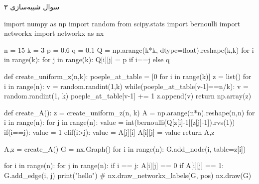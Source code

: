 سوال شبیه‌سازی ۳

\begin{latin}
\begin{python}
import numpy as np
import random
from scipy.stats import bernoulli
import networkx
import networkx as nx

n = 15
k = 3
p = 0.6
q = 0.1
Q = np.arange(k*k, dtype=float).reshape(k,k)
for i in range(k):
    for j in range(k):
        Q[i][j] = p if i==j else q

def create_uniform_z(n,k):
    poeple_at_table = [0 for i in range(k)]
    z = list()
    for i in range(n):
        v = random.randint(1,k)
        while(poeple_at_table[v-1]==n/k): v = random.randint(1, k)
        poeple_at_table[v-1] += 1
        z.append(v)
    return np.array(z)


def create_A():
    z = create_uniform_z(n, k)
    A = np.arange(n*n).reshape(n,n)
    for i in range(n):
        for j in range(n):
            value = int(bernoulli(Q[z[i]-1][z[j]-1]).rvs(1))
            if(i==j): value = 1
            elif(i>j): value = A[j][i]
            A[i][j] = value
    return A,z

A,z = create_A()
G = nx.Graph()
for i in range(n):
    G.add_node(i, table=z[i])

for i in range(n):
    for j in range(n):
        if  i == j:
            A[i][j] == 0
        if A[i][j] == 1:
            G.add_edge(i, j)
print("hello")
# nx.draw_networkx_labels(G, pos)
nx.draw(G)
\end{python}
\end{latin}